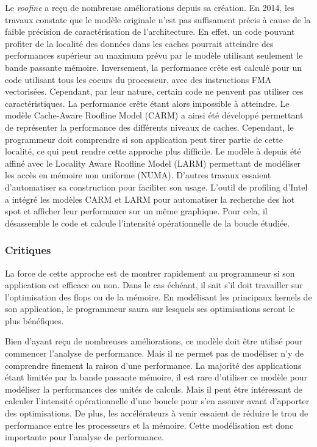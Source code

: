 Le \textit{roofine} a reçu de nombreuse améliorations depuis sa création. En 2014, les travaux \cite{Ilic2014} constate que le modèle originale n’est pas suffisament précis à cause de la faible précision de caractérisation de l’architecture. En effet, un code pouvant profiter de la localité des données dans les caches pourrait atteindre des performances supérieur au maximum prévu par le modèle utilisant seulement le bande passante mémoire. Inversement, la performance crête est calculé pour un code utilisant tous les coeurs du processeur, avec des instructions FMA vectorisées. Cependant, par leur nature, certain code ne peuvent pas utiliser ces  caractéristiques. La performance crête étant alors impossible à atteindre. Le modèle Cache-Aware Roofline Model (CARM) \cite{Ilic2014} a ainsi été développé permettant de représenter la performance des différents niveaux de caches. Cependant, le programmeur doit comprendre si son application peut tirer partie de cette localité, ce qui peut rendre cette approche plus difficile. Le modèle à depuis été affiné avec le Locality Aware Roofline Model (LARM) \cite{Denoyelle2018} permettant de modéliser les accès en mémoire non uniforme (NUMA).
D’autres travaux essaient d’automatiser sa construction \cite{lo2014roofline} pour faciliter son usage. L’outil de profiling d’Intel a intégré les modèles CARM et LARM pour automatiser la recherche des hot spot et afficher leur performance sur un même graphique. Pour cela, il désassemble le code et calcule l’intensité opérationnelle de la boucle étudiée.


\subsubsection{Critiques}

La force de cette approche est de montrer rapidement au programmeur si son application est efficace ou non. Dans le cas échéant, il sait s’il doit travailler sur l’optimisation des flops ou de la mémoire. En modélisant les principaux kernels de son application, le programmeur saura sur lesquels ses optimisations seront le plus bénéfiques.

Bien d’ayant reçu de nombreuses améliorations, ce modèle doit être utilisé pour commencer l’analyse de performance. Mais il ne permet pas de modéliser n’y de comprendre finement la raison d’une performance.
La majorité des applications étant limitée par la bande passante mémoire, il est rare d’utiliser ce modèle pour modéliser la performances des unités de calculs. Mais il peut être intéressant de calculer l’intensité opérationnelle d’une boucle pour s’en assurer avant d’apporter des optimisations. De plus, les accélérateurs à venir essaient de réduire le trou de performance entre les processeurs et la mémoire. Cette modélisation est donc importante pour l’analyse de performance.


\printbibliography[heading=references,segment=\therefsegment]
